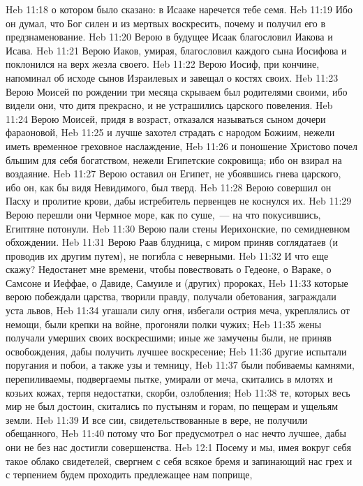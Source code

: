 \vs Heb 11:18 о котором было сказано: в Исааке наречется тебе семя.
\vs Heb 11:19 Ибо он думал, что Бог силен и из мертвых воскресить, почему и получил его в предзнаменование.
\vs Heb 11:20 Верою в будущее Исаак благословил Иакова и Исава.
\vs Heb 11:21 Верою Иаков, умирая, благословил каждого сына Иосифова и поклонился на верх жезла своего.
\vs Heb 11:22 Верою Иосиф, при кончине, напоминал об исходе сынов Израилевых и завещал о костях своих.
\vs Heb 11:23 Верою Моисей по рождении три месяца скрываем был родителями своими, ибо видели они, что дитя прекрасно, и не устрашились царского повеления.
\vs Heb 11:24 Верою Моисей, придя в возраст, отказался называться сыном дочери фараоновой,
\vs Heb 11:25 и лучше захотел страдать с народом Божиим, нежели иметь временное греховное наслаждение,
\vs Heb 11:26 и поношение Христово почел бльшим для себя богатством, нежели Египетские сокровища; ибо он взирал на воздаяние.
\vs Heb 11:27 Верою оставил он Египет, не убоявшись гнева царского, ибо он, как бы видя Невидимого, был тверд.
\vs Heb 11:28 Верою совершил он Пасху и пролитие крови, дабы истребитель первенцев не коснулся их.
\vs Heb 11:29 Верою перешли они Чермное море, как по суше,~--- на что покусившись, Египтяне потонули.
\vs Heb 11:30 Верою пали стены Иерихонские, по семидневном обхождении.
\vs Heb 11:31 Верою Раав блудница, с миром приняв соглядатаев (и проводив их другим путем), не погибла с неверными.
\vs Heb 11:32 И что еще скажу? Недостанет мне времени, чтобы повествовать о Гедеоне, о Вараке, о Самсоне и Иеффае, о Давиде, Самуиле и (других) пророках,
\vs Heb 11:33 которые верою побеждали царства, творили правду, получали обетования, заграждали уста львов,
\vs Heb 11:34 угашали силу огня, избегали острия меча, укреплялись от немощи, были крепки на войне, прогоняли полки чужих;
\vs Heb 11:35 жены получали умерших своих воскресшими; иные же замучены были, не приняв освобождения, дабы получить лучшее воскресение;
\vs Heb 11:36 другие испытали поругания и побои, а также узы и темницу,
\vs Heb 11:37 были побиваемы камнями, перепиливаемы, подвергаемы пытке, умирали от меча, скитались в млотях и козьих кожах, терпя недостатки, скорби, озлобления;
\vs Heb 11:38 те, которых весь мир не был достоин, скитались по пустыням и горам, по пещерам и ущельям земли.
\vs Heb 11:39 И все сии, свидетельствованные в вере, не получили обещанного,
\vs Heb 11:40 потому что Бог предусмотрел о нас нечто лучшее, дабы они не без нас достигли совершенства.
\vs Heb 12:1 Посему и мы, имея вокруг себя такое облако свидетелей, свергнем с себя всякое бремя и запинающий нас грех и с терпением будем проходить предлежащее нам поприще,
